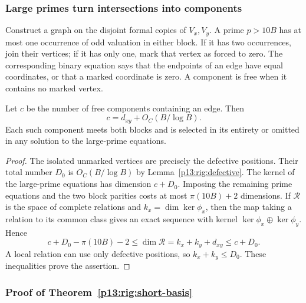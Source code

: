 \subsubsection{Large primes turn intersections into components}

Construct a graph on the disjoint formal copies of $V_x,V_y$.
A prime $p>10B$ has at most one occurrence of odd valuation
in either block.  If it has two occurrences, join their vertices;
if it has only one, mark that vertex as forced to zero.
The corresponding binary equation says that the endpoints of
an edge have equal coordinates, or that a marked coordinate is
zero.  A component is free when it contains no marked vertex.

\begin{lemma}
\label{p13:rig:components}
Let $c$ be the number of free components containing an edge.
Then
\[
                         c=d_{xy}+O_C(B/\log B).
\]
Each such component meets both blocks and is selected in its
entirety or omitted in any solution to the large-prime equations.
\end{lemma}

\begin{proof}
The isolated unmarked vertices are precisely the defective
positions.  Their total number $D_0$ is $O_C(B/\log B)$ by
Lemma~\ref{p13:rig:defective}.  The kernel of the large-prime
equations has dimension $c+D_0$.  Imposing the remaining
prime equations and the two block parities costs at most
$\pi(10B)+2$ dimensions.  If $\mathcal R$ is the space of
complete relations and $k_x=\dim\ker\phi_x$, then the map
taking a relation to its common class gives an exact sequence
with kernel $\ker\phi_x\oplus\ker\phi_y$.  Hence
\[
 c+D_0-\pi(10B)-2\le\dim\mathcal R=k_x+k_y+d_{xy}
                                      \le c+D_0.
\]
A local relation can use only defective positions, so
$k_x+k_y\le D_0$.  These inequalities prove the assertion.
\end{proof}


\subsubsection{Proof of Theorem~\ref{p13:rig:short-basis}}
\label{p14:comp:rigidity:short-basis}


